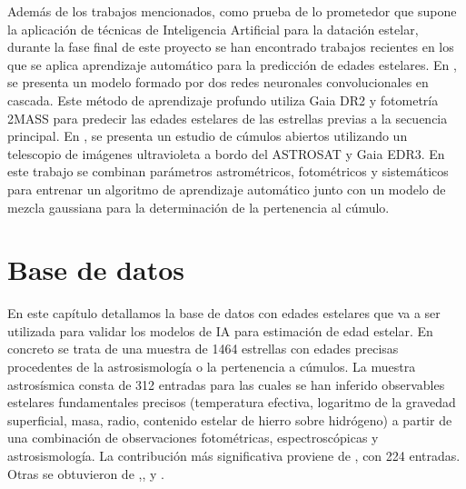 Además de los trabajos mencionados, como prueba de lo prometedor que supone la aplicación de técnicas de Inteligencia Artificial para la datación estelar, durante la fase final de este proyecto se han encontrado trabajos recientes en los que se aplica aprendizaje automático para la predicción de edades estelares. En \cite{2020AAS...23633104M}, se presenta un modelo formado por dos redes neuronales convolucionales en cascada. Este método de aprendizaje profundo utiliza Gaia DR2 y fotometría 2MASS para predecir las edades estelares de las estrellas previas a la secuencia principal. En \cite{Jadhav_2021}, se presenta un estudio de cúmulos abiertos utilizando un telescopio de imágenes ultravioleta a bordo del ASTROSAT y Gaia EDR3. En este trabajo se combinan parámetros astrométricos, fotométricos y sistemáticos para entrenar un algoritmo de aprendizaje automático junto con un modelo de mezcla gaussiana para la determinación de la pertenencia al cúmulo.


\chapter{Base de datos}
\label{sec:data}
En este capítulo detallamos la base de datos con edades estelares que va a ser utilizada para validar los modelos de IA para estimación de edad estelar.
En concreto se trata de una muestra de 1464 estrellas con edades precisas procedentes de la astrosismología o la pertenencia a cúmulos. La muestra astrosísmica consta de 312 entradas para las cuales se han inferido observables estelares fundamentales precisos (temperatura efectiva, logaritmo de la gravedad superficial, masa, radio, contenido estelar de hierro sobre hidrógeno) a partir de una combinación de observaciones fotométricas, espectroscópicas y astrosismología. La contribución más significativa proviene de \cite{Serenelli17}, con 224 entradas. Otras se obtuvieron de \cite{Ceillier16},\cite{Garcia14},\cite{Silva15} y \cite{Silva17}. %

\begin{table}[H]
\centering
\centering
{}
\caption{Características proporcionadas en la base de datos para cada estrella.}\label{table:data}
\end{table}

